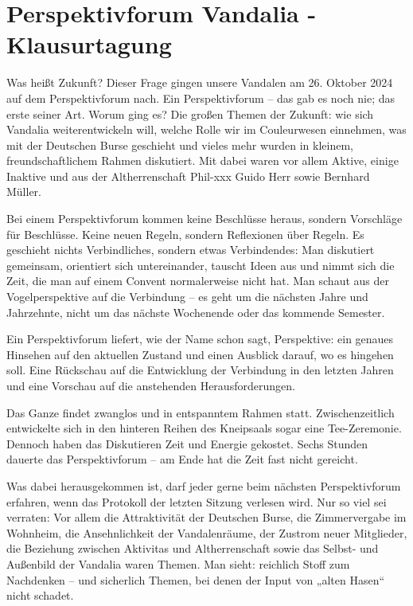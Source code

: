 \section{Perspektivforum Vandalia - Klausurtagung}


\begin{multicols}{2}	

Was heißt Zukunft? Dieser Frage gingen
unsere Vandalen am 26. Oktober 2024 auf dem Perspektivforum nach. Ein
Perspektivforum – das gab es noch nie; das erste seiner Art. Worum ging es? Die
großen Themen der Zukunft: wie sich Vandalia weiterentwickeln will, welche
Rolle wir im Couleurwesen einnehmen, was mit der Deutschen Burse geschieht und
vieles mehr wurden in kleinem, freundschaftlichem Rahmen diskutiert. Mit dabei
waren vor allem Aktive, einige Inaktive und aus der Altherrenschaft Phil-xxx
Guido Herr sowie Bernhard Müller.

Bei einem Perspektivforum kommen keine
Beschlüsse heraus, sondern Vorschläge für Beschlüsse. Keine neuen Regeln,
sondern Reflexionen über Regeln. Es geschieht nichts Verbindliches, sondern
etwas Verbindendes: Man diskutiert gemeinsam, orientiert sich untereinander,
tauscht Ideen aus und nimmt sich die Zeit, die man auf einem Convent
normalerweise nicht hat. Man schaut aus der Vogelperspektive auf die Verbindung
– es geht um die nächsten Jahre und Jahrzehnte, nicht um das nächste Wochenende
oder das kommende Semester.

Ein Perspektivforum liefert, wie der Name
schon sagt, Perspektive: ein genaues Hinsehen auf den aktuellen Zustand und
einen Ausblick darauf, wo es hingehen soll. Eine Rückschau auf die Entwicklung
der Verbindung in den letzten Jahren und eine Vorschau auf die anstehenden
Herausforderungen.

Das Ganze findet zwanglos und in
entspanntem Rahmen statt. Zwischenzeitlich entwickelte sich in den hinteren
Reihen des Kneipsaals sogar eine Tee-Zeremonie. Dennoch haben das Diskutieren
Zeit und Energie gekostet. Sechs Stunden dauerte das Perspektivforum – am Ende
hat die Zeit fast nicht gereicht.

Was dabei herausgekommen ist, darf jeder
gerne beim nächsten Perspektivforum erfahren, wenn das Protokoll der letzten
Sitzung verlesen wird. Nur so viel sei verraten: Vor allem die Attraktivität
der Deutschen Burse, die Zimmervergabe im Wohnheim, die Ansehnlichkeit der
Vandalenräume, der Zustrom neuer Mitglieder, die Beziehung zwischen Aktivitas
und Altherrenschaft sowie das Selbst- und Außenbild der Vandalia waren Themen.
Man sieht: reichlich Stoff zum Nachdenken – und sicherlich Themen, bei denen
der Input von „alten Hasen“ nicht schadet.


\end{multicols}
